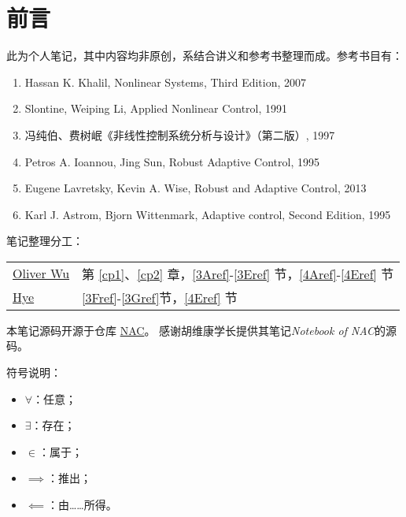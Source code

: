 \chapter*{前言}
此为个人笔记，其中内容均非原创，系结合讲义和参考书整理而成。参考书目有：
\begin{enumerate}
    \item Hassan K. Khalil, Nonlinear Systems, Third Edition, 2007
    \item Slontine, Weiping Li, Applied   Nonlinear    Control, 1991
    \item 冯纯伯、费树岷《非线性控制系统分析与设计》（第二版）, 1997
    \item Petros A. Ioannou, Jing Sun, Robust Adaptive Control, 1995
    \item Eugene Lavretsky, Kevin A. Wise, Robust and Adaptive Control, 2013
    \item Karl J. Astrom, Bjorn Wittenmark, Adaptive control, Second Edition, 1995
\end{enumerate}

笔记整理分工：
\begin{table*}[htbp]
  \centering
  \setcellgapes{4pt}
  \makegapedcells
  \begin{tabular}{p{3.0cm}p{9.0cm}}
    \hline
    \href{https://github.com/OliverWu515}{Oliver Wu} & 第 \ref{cp1}、\ref{cp2} 章，\ref{3Aref}-\ref{3Eref} 节，\ref{4Aref}-\ref{4Eref} 节\\
    \href{https://github.com/Co-ding-Man}{Hye} & \ref{3Fref}-\ref{3Gref}节，\ref{4Eref} 节\\
    \hline
  \end{tabular}
\end{table*}

本笔记源码开源于仓库 \href{https://github.com/OliverWu515/NAC}{NAC}。
感谢胡维康学长提供其笔记{\it Notebook of NAC}的源码。

符号说明：
\begin{itemize}
    \item $\forall$：任意；
    \item $\exists$：存在；
    \item $\in$：属于；
    \item $\implies$：推出；
    \item $\impliedby$：由……所得。
\end{itemize}